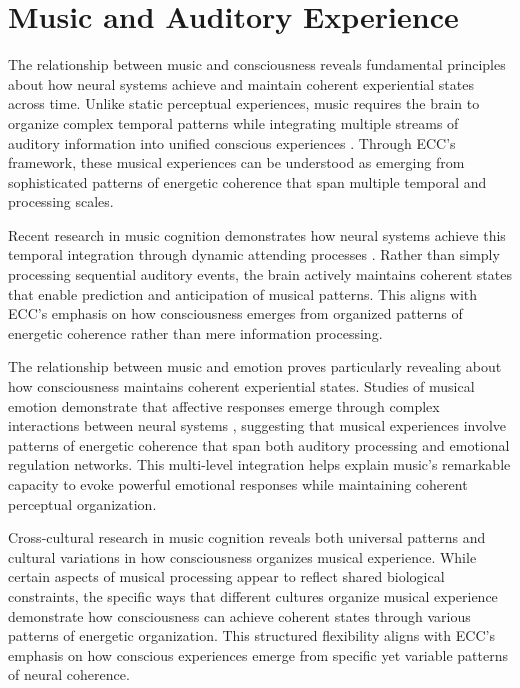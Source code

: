 \section{Music and Auditory Experience}

The relationship between music and consciousness reveals fundamental principles about how neural systems achieve and maintain coherent experiential states across time. Unlike static perceptual experiences, music requires the brain to organize complex temporal patterns while integrating multiple streams of auditory information into unified conscious experiences \cite{Janata2002}. Through ECC's framework, these musical experiences can be understood as emerging from sophisticated patterns of energetic coherence that span multiple temporal and processing scales.

Recent research in music cognition demonstrates how neural systems achieve this temporal integration through dynamic attending processes \cite{Large1999}. Rather than simply processing sequential auditory events, the brain actively maintains coherent states that enable prediction and anticipation of musical patterns. This aligns with ECC's emphasis on how consciousness emerges from organized patterns of energetic coherence rather than mere information processing.

The relationship between music and emotion proves particularly revealing about how consciousness maintains coherent experiential states. Studies of musical emotion demonstrate that affective responses emerge through complex interactions between neural systems \cite{Thompson2010}, suggesting that musical experiences involve patterns of energetic coherence that span both auditory processing and emotional regulation networks. This multi-level integration helps explain music's remarkable capacity to evoke powerful emotional responses while maintaining coherent perceptual organization.

Cross-cultural research in music cognition \cite{Patel2010} reveals both universal patterns and cultural variations in how consciousness organizes musical experience. While certain aspects of musical processing appear to reflect shared biological constraints, the specific ways that different cultures organize musical experience demonstrate how consciousness can achieve coherent states through various patterns of energetic organization. This structured flexibility aligns with ECC's emphasis on how conscious experiences emerge from specific yet variable patterns of neural coherence.

